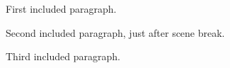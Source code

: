 First included paragraph.

\scenebreak

Second included paragraph, just after scene break.



Third included paragraph.
